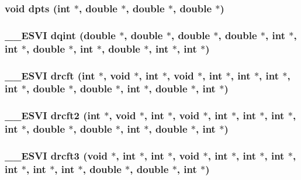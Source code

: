 \subsubsection{\setlength{\rightskip}{0pt plus 5cm}void dpts (int $\ast$, double $\ast$, double $\ast$, double $\ast$)}\label{essl_8h_7d5be0b7237af4039e96abcda4bff20f}


\subsubsection{\setlength{\rightskip}{0pt plus 5cm}\_\-\_\-ESVI dqint (double $\ast$, double $\ast$, double $\ast$, double $\ast$, int $\ast$, int $\ast$, double $\ast$, int $\ast$, double $\ast$, int $\ast$, int $\ast$)}\label{essl_8h_825e433b2e6314b86d92278f7b85c750}


\subsubsection{\setlength{\rightskip}{0pt plus 5cm}\_\-\_\-ESVI drcft (int $\ast$, void $\ast$, int $\ast$, void $\ast$, int $\ast$, int $\ast$, int $\ast$, int $\ast$, double $\ast$, double $\ast$, int $\ast$, double $\ast$, int $\ast$)}\label{essl_8h_3724cfcfc7c0a5cb5e01e5cbe9b23c61}


\subsubsection{\setlength{\rightskip}{0pt plus 5cm}\_\-\_\-ESVI drcft2 (int $\ast$, void $\ast$, int $\ast$, void $\ast$, int $\ast$, int $\ast$, int $\ast$, int $\ast$, double $\ast$, double $\ast$, int $\ast$, double $\ast$, int $\ast$)}\label{essl_8h_c722bc295e14f092a4108aad079fa308}


\subsubsection{\setlength{\rightskip}{0pt plus 5cm}\_\-\_\-ESVI drcft3 (void $\ast$, int $\ast$, int $\ast$, void $\ast$, int $\ast$, int $\ast$, int $\ast$, int $\ast$, int $\ast$, int $\ast$, double $\ast$, double $\ast$, int $\ast$)}\label{essl_8h_c7c97f84ed0c606150af27697bfae5c9}


